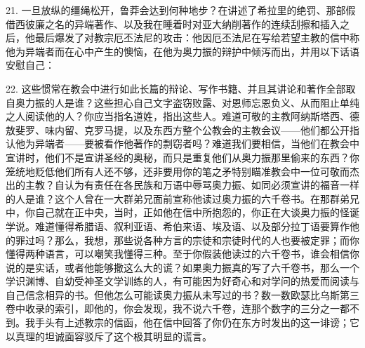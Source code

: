 21. 一旦放纵的缰绳松开，鲁莽会达到何种地步？在讲述了希拉里的绝罚、那部假借西彼廉之名的异端著作、以及我在睡着时对亚大纳削著作的连续刮擦和插入之后，他最后爆发了对教宗厄丕法尼的攻击：他因厄丕法尼在写给若望主教的信中称他为异端者而在心中产生的懊恼，在他为奥力振的辩护中倾泻而出，并用以下话语安慰自己：\par

\par

22. 这些惯常在教会中进行如此长篇的辩论、写作书籍、并且其讲论和著作全部取自奥力振的人是谁？这些担心自己文字盗窃败露、对恩师忘恩负义、从而阻止单纯之人阅读他的人？你应当指名道姓，指出这些人。难道可敬的主教阿纳斯塔西、德敖斐罗、味内留、克罗马提，以及东西方整个公教会的主教会议——他们都公开指认他为异端者——要被看作他著作的剽窃者吗？难道我们要相信，当他们在教会中宣讲时，他们不是宣讲圣经的奥秘，而只是重复他们从奥力振那里偷来的东西？你笼统地贬低他们所有人还不够，还非要用你的笔之矛特别瞄准教会中一位可敬而杰出的主教？自认为有责任在各民族和万语中辱骂奥力振、如同必须宣讲的福音一样的人是谁？这个人曾在一大群弟兄面前宣称他读过奥力振的六千卷书。在那群弟兄中，你自己就在正中央，当时，正如他在信中所抱怨的，你正在大谈奥力振的怪诞学说。难道懂得希腊语、叙利亚语、希伯来语、埃及语、以及部分拉丁语要算作他的罪过吗？那么，我想，那些说各种方言的宗徒和宗徒时代的人也要被定罪；而你懂得两种语言，可以嘲笑我懂得三种。至于你假装他读过的六千卷书，谁会相信你说的是实话，或者他能够撒这么大的谎？如果奥力振真的写了六千卷书，那么一个学识渊博、自幼受神圣文学训练的人，有可能因为好奇心和对学问的热爱而阅读与自己信念相异的书。但他怎么可能读奥力振从未写过的书？数一数欧瑟比乌斯第三卷中收录的索引，即他的，你会发现，我不说六千卷，连那个数字的三分之一都不到。我手头有上述教宗的信函，他在信中回答了你仍在东方时发出的这一诽谤；它以真理的坦诚面容驳斥了这个极其明显的谎言。\par


